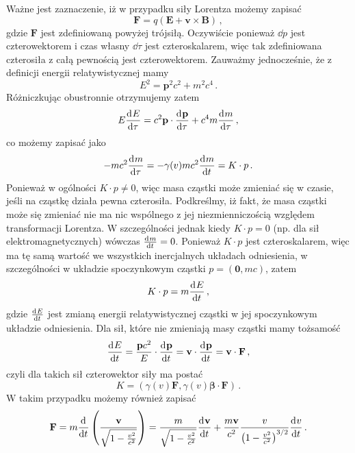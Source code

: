 \documentclass[../main.tex]{subfiles}
\begin{document}
Ważne jest zaznaczenie, iż w przypadku siły Lorentza możemy zapisać
\begin{equation*}
    \mathbf{F}=q(\mathbf{E}+\mathbf{v}\times\mathbf{B})\,,
\end{equation*}
gdzie \(\mathbf{F}\) jest zdefiniowaną powyżej trójsiłą. Oczywiście ponieważ \(\dd{p}\) jest
czterowektorem i czas własny \(\dd{\tau}\) jest czteroskalarem, więc tak zdefiniowana czterosiła z
całą pewnością jest czterowektorem. Zauważmy jednocześnie, że z definicji energii relatywistycznej
mamy
\begin{equation*}
    E^2=\mathbf{p}^2c^2+m^2c^4\,.
\end{equation*}
Różniczkując obustronnie otrzymujemy zatem
\begin{equation*}
    E\dv[]{E}{\tau}=c^2\mathbf{p}\cdot\dv[]{\mathbf{p}}{\tau}+c^4m\dv[]{m}{\tau}\,,
\end{equation*}
co możemy zapisać jako
\begin{equation*}
    -mc^2\dv[]{m}{\tau}=-\gamma(v)mc^2\dv[]{m}{t}=K\cdot p\,.
\end{equation*}
Ponieważ w ogólności \(K\cdot p\neq 0\), więc masa cząstki może zmieniać się w czasie, jeśli na
cząstkę działa pewna czterosiła. Podkreślmy, iż fakt, że masa cząstki może się zmieniać nie ma nic
wspólnego z jej niezmienniczością względem transformacji Lorentza. W szczególności jednak kiedy
\(K\cdot p= 0\) (np. dla sił elektromagnetycznych) wówczas \(\dv[]{m}{t}=0\). Ponieważ \(K\cdot p\)
jest czteroskalarem, więc ma tę samą wartość we wszystkich inercjalnych układach odniesienia, w
szczególności w układzie spoczynkowym cząstki \(p=(\mathbf{0},mc)\), zatem
\begin{equation*}
    K\cdot p=m\dv[]{E}{t}\,,
\end{equation*}
gdzie \(\dv[]{E}{t}\) jest zmianą energii relatywistycznej cząstki w jej spoczynkowym układzie
odniesienia. Dla sił, które nie zmieniają masy cząstki mamy tożsamość
\begin{equation*}
    \dv[]{E}{t}=\frac{\mathbf{p}c^2}{E}\cdot\dv[]{\mathbf{p}}{t}=\mathbf{v}\cdot\dv[]{\mathbf{p}}{t}=\mathbf{v}\cdot\mathbf{F}\,,
\end{equation*}
czyli dla takich sił czterowektor siły ma postać
\begin{equation*}
    K=\left(\gamma(v)\mathbf{F},\gamma(v)\boldsymbol{\beta}\cdot\mathbf{F}\right)\,.
\end{equation*}
W takim przypadku możemy również zapisać
\begin{equation*}
    \mathbf{F}=m\dv[]{}{t}\left(\frac{\mathbf{v}}{\sqrt{1-\frac{v^2}{c^2}}}\right)=\frac{m}{\sqrt{1-\frac{v^2}{c^2}}}\dv[]{\mathbf{v}}{t}+\frac{m\mathbf{v}}{c^2}\frac{v}{\left(1-\frac{v^2}{c^2}\right)^{3/2}}\dv[]{v}{t}\,.
\end{equation*}
\end{document}
